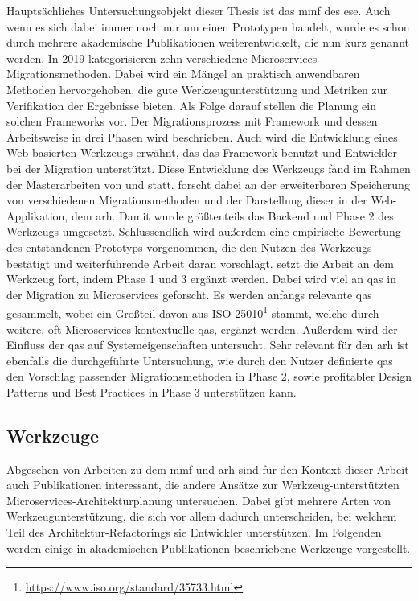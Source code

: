Hauptsächliches Untersuchungsobjekt dieser Thesis ist das \gls{mmf} des \gls{ese}.
Auch wenn es sich dabei immer noch nur um einen Prototypen handelt, wurde es schon durch mehrere akademische Publikationen weiterentwickelt, die nun kurz genannt werden.
In 2019 kategorisieren  zehn verschiedene Microservices-Migrationsmethoden.
Dabei wird ein Mängel an praktisch anwendbaren Methoden hervorgehoben, die gute Werkzeugunterstützung und Metriken zur Verifikation der Ergebnisse bieten.
Als Folge darauf stellen  die Planung ein solchen Frameworks vor.
Der Migrationsprozess mit Framework und dessen Arbeitsweise in drei Phasen wird beschrieben.
Auch wird die Entwicklung eines Web-basierten Werkzeugs erwähnt, das das Framework benutzt und Entwickler bei der Migration unterstützt.
Diese Entwicklung des Werkzeugs fand im Rahmen der Masterarbeiten von  und  statt.
 forscht dabei an der erweiterbaren Speicherung von verschiedenen Migrationsmethoden und der Darstellung dieser in der Web-Applikation, dem \gls{arh}.
Damit wurde größtenteils das Backend und Phase 2 des Werkzeugs umgesetzt.
Schlussendlich wird außerdem eine empirische Bewertung des entstandenen Prototyps vorgenommen, die den Nutzen des Werkzeugs bestätigt und weiterführende Arbeit daran vorschlägt.
 setzt die Arbeit an dem Werkzeug fort, indem Phase 1 und 3 ergänzt werden.
Dabei wird viel an \glspl{qa} in der Migration zu Microservices geforscht.
Es werden anfangs relevante \glspl{qa} gesammelt, wobei ein Großteil davon aus ISO 25010\footnote{\url{https://www.iso.org/standard/35733.html}} stammt, welche durch weitere, oft Microservices-kontextuelle \glspl{qa}, ergänzt werden.
Außerdem wird der Einfluss der \glspl{qa} auf Systemeigenschaften untersucht.
Sehr relevant für den \gls{arh} ist ebenfalls die durchgeführte Untersuchung, wie durch den Nutzer definierte \glspl{qa} den Vorschlag passender Migrationsmethoden in Phase 2, sowie profitabler Design Patterns und Best Practices in Phase 3 unterstützen kann.

\subsection{Werkzeuge}

Abgesehen von Arbeiten zu dem \gls{mmf} und \gls{arh} sind für den Kontext dieser Arbeit auch Publikationen interessant, die andere Ansätze zur Werkzeug-unterstützten Microservices-Architekturplanung untersuchen.
Dabei gibt mehrere Arten von Werkzeugunterstützung, die sich vor allem dadurch unterscheiden, bei welchem Teil des Architektur-Refactorings sie Entwickler unterstützen.
Im Folgenden werden einige in akademischen Publikationen beschriebene Werkzeuge vorgestellt.

